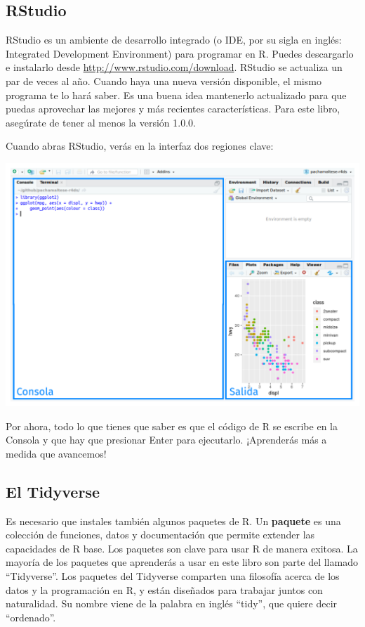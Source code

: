 \documentclass[11pt,oneside]{report}
\begin{document}
\hypertarget{rstudio}{%
\subsection{RStudio}\label{rstudio}}

RStudio es un ambiente de desarrollo integrado (o IDE, por su sigla en
inglés: Integrated Development Environment) para programar en R. Puedes
descargarlo e instalarlo desde \url{http://www.rstudio.com/download}.
RStudio se actualiza un par de veces al año. Cuando haya una nueva
versión disponible, el mismo programa te lo hará saber. Es una buena
idea mantenerlo actualizado para que puedas aprovechar las mejores y más
recientes características. Para este libro, asegúrate de tener al menos
la versión 1.0.0.

Cuando abras RStudio, verás en la interfaz dos regiones clave:

\begin{center}\includegraphics[width=0.75\linewidth]{diagrams_pdf/es/rstudio-console} \end{center}

Por ahora, todo lo que tienes que saber es que el código de R se escribe
en la Consola y que hay que presionar Enter para ejecutarlo. ¡Aprenderás
más a medida que avancemos!

\hypertarget{el-tidyverse}{%
\subsection{El Tidyverse}\label{el-tidyverse}}

Es necesario que instales también algunos paquetes de R. Un
\textbf{paquete} es una colección de funciones, datos y documentación
que permite extender las capacidades de R base. Los paquetes son clave
para usar R de manera exitosa. La mayoría de los paquetes que aprenderás
a usar en este libro son parte del llamado ``Tidyverse''. Los paquetes
del Tidyverse comparten una filosofía acerca de los datos y la
programación en R, y están diseñados para trabajar juntos con
naturalidad. Su nombre viene de la palabra en inglés ``tidy'', que
quiere decir ``ordenado''.
\end{document}
